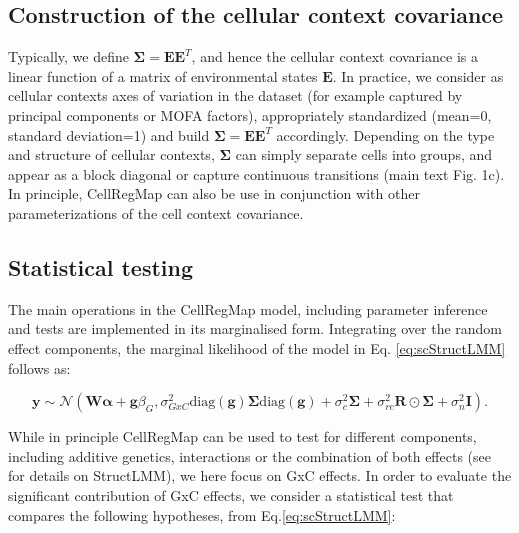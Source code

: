 

\subsection{Construction of the cellular context covariance}

Typically, we define $\boldsymbol{\Sigma} = \mathbf{E}\mathbf{E}^T$, and hence the cellular context covariance is a linear function of a matrix of environmental states $\mathbf{E}$.
In practice, we consider as cellular contexts axes of variation in the dataset (for example captured by principal components or MOFA \cite{argelaguet2018multi} factors), appropriately standardized (mean=0, standard deviation=1) and build $\boldsymbol{\Sigma} = \mathbf{E}\mathbf{E}^T$ accordingly.
Depending on the type and structure of cellular contexts, $\boldsymbol{\Sigma}$ can simply separate cells into groups, and appear as a block diagonal or capture continuous transitions (main text Fig. 1c). 
In principle, CellRegMap can also be use in conjunction with other parameterizations of the cell context covariance.

\subsection{Statistical testing}

The main operations in the CellRegMap model, including parameter inference and tests are implemented in its marginalised form. 
Integrating over the random effect components, the marginal likelihood of the model in Eq. \eqref{eq:scStructLMM} follows as:

\begin{equation}
    \label{eq:scStructLMM_marginal}
     \mathbf{y} \sim \mathcal{N} ( \mathbf{W}\boldsymbol{\alpha} + \mathbf{g}\beta_G, \sigma^2_{GxC} \text{diag}(\mathbf{g}) \boldsymbol{\Sigma} \text{diag}(\mathbf{g}) + \sigma_c^2 \boldsymbol{\Sigma} + \sigma_{rc}^2 \mathbf{R} \odot \boldsymbol{\Sigma}+ \sigma_n^2 \mathbf{I} ). 
\end{equation}

While in principle CellRegMap can be used to test for different components, including additive genetics, interactions or the combination of both effects (see~\cite{moore2019linear} for details on StructLMM), we here focus on GxC effects. 
In order to evaluate the significant contribution of GxC effects, we consider a statistical test that compares the following hypotheses, from Eq.\eqref{eq:scStructLMM}:

